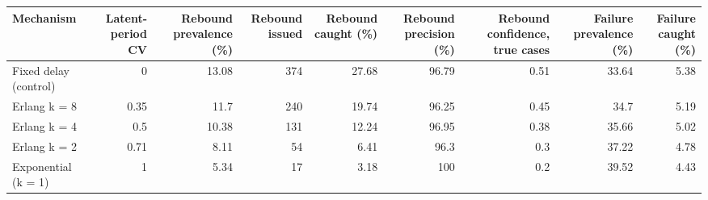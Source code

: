 \begin{tabular}{lrrrrrrrr}
\toprule
Mechanism & Latent-period CV & Rebound prevalence (\%) & Rebound issued & Rebound caught (\%) & Rebound precision (\%) & Rebound confidence, true cases & Failure prevalence (\%) & Failure caught (\%) \\
\midrule
Fixed delay (control) & 0 & 13.08 & 374 & 27.68 & 96.79 & 0.51 & 33.64 & 5.38 \\
Erlang k = 8 & 0.35 & 11.7 & 240 & 19.74 & 96.25 & 0.45 & 34.7 & 5.19 \\
Erlang k = 4 & 0.5 & 10.38 & 131 & 12.24 & 96.95 & 0.38 & 35.66 & 5.02 \\
Erlang k = 2 & 0.71 & 8.11 & 54 & 6.41 & 96.3 & 0.3 & 37.22 & 4.78 \\
Exponential (k = 1) & 1 & 5.34 & 17 & 3.18 & 100 & 0.2 & 39.52 & 4.43 \\
\bottomrule
\end{tabular}
